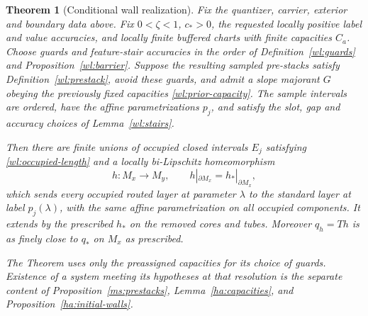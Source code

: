 \documentclass[11pt]{article}
\numberwithin{equation}{section}
\newtheorem{theorem}{Theorem}[section]
\theoremstyle{definition}
\theoremstyle{remark}
\begin{document}
\begin{theorem}[Conditional wall realization]\label{wl:realization}
Fix the quantizer, carrier, exterior and boundary data above.  Fix
$0<\zeta<1$, $c_*>0$, the requested locally positive label and value
accuracies, and locally finite buffered charts with finite
capacities $C_a$.  Choose guards and feature-stair accuracies in the
order of Definition~\ref{wl:guards} and
Proposition~\ref{wl:barrier}.  Suppose the resulting sampled
pre-stacks satisfy Definition~\ref{wl:prestack}, avoid these guards,
and admit a slope majorant $G$ obeying the previously fixed
capacities \eqref{wl:prior-capacity}.  The sample intervals are
ordered, have the affine parametrizations $p_j$, and satisfy the
slot, gap and accuracy choices of Lemma~\ref{wl:stairs}.

Then there are finite unions of occupied closed intervals $E_j$
satisfying \eqref{wl:occupied-length} and a locally bi-Lipschitz
homeomorphism
\[
 h:M_x\longrightarrow M_y,\qquad h|_{\partial M_x}=h_*|_{\partial M_x},
\]
which sends every occupied routed layer at parameter $\lambda$ to
the standard layer at label $p_j(\lambda)$, with the same affine
parametrization on all occupied components.  It extends by the
prescribed $h_*$ on the removed cores and tubes.  Moreover
$q_h=Th$ is as finely close to $q_*$ on $M_x$ as prescribed.

The Theorem uses only the preassigned capacities for its choice of
guards.  Existence of a system meeting its hypotheses at that
resolution is the separate content of
Proposition~\ref{ms:prestacks}, Lemma~\ref{ha:capacities}, and
Proposition~\ref{ha:initial-walls}.
\end{theorem}
\end{document}

